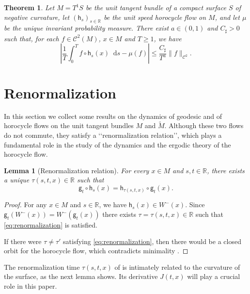 \documentclass[11pt,letterpaper]{amsart}
\newcommand \R {{ \mathbb R}}
\newcommand \tM {{\widetilde M}}
\newcommand \cC {{\mathscr{C}}}
\newcommand \sC {{C_\sharp}}
\newcommand{\horo}{\mathsf{h}}
\newcommand{\geo}{\mathsf{g}}
\newcommand*{\diff}{\mathop{}\!\mathrm{d}}
\newtheorem {lemma}[theorem]{Lemma}
\newtheorem{bigthm}{Theorem}
\theoremstyle{definition}
\begin{document}
\begin{bigthm}\label{thm:main_result_3}
Let $M = T^1S$ be the unit tangent bundle of a compact surface $S$ of negative curvature, let $(\horo_s)_{s \in \R}$ be the unit speed horocycle flow on $M$, and let $\mu$ be the unique invariant probability measure. There exist $a \in (0,1)$ and $\sC>0$ such that, for each $f\in \cC^2(M)$, $x\in M$ and $T \ge 1$, we have
\begin{equation}\label{eq:deviation}
\left\lvert \frac 1T \int_0^T f\circ \horo_s(x)\diff s - \mu(f) \right\rvert \leq \dfrac{\sC}{T^{a}} \|f\|_{\cC^2}.
\end{equation}
\end{bigthm}


\section{Renormalization}\label{sec:renorm}
In this section we collect some results on the dynamics of geodesic and of horocycle flows on the unit tangent bundles $M$ and $\tM$.
Although these two flows do not commute, they satisfy a \lq\lq renormalization relation\rq\rq, which plays a fundamental role in the study of the dynamics and the ergodic theory of the horocycle flow.

\begin{lemma}[Renormalization relation]\label{lem:renormalization}
For every $x\in M$ and $s,t \in \R$, there exists a unique $\tau(s,t,x) \in \R$ such that
\begin{equation}\label{eq:renormalization}
\geo_t \circ \horo_s(x) = \horo_{\tau(s,t,x)} \circ \geo_t(x).
\end{equation}
\end{lemma}
\begin{proof}
For any $x \in M$ and $s \in \R$, we have $\horo_s(x) \in W^{-}(x)$. Since $\geo_t(W^{-}(x)) = W^{-}(\geo_t(x))$ there exists $\tau = \tau(s,t,x) \in \R$ such that \eqref{eq:renormalization} is satisfied.

If there were $\tau \neq \tau'$ satisfying \eqref{eq:renormalization}, then there would be a closed orbit for the horocycle flow, which contradicts minimality \cite{Bow, Pla}.
\end{proof}

The renormalization time $\tau(s,t,x)$ of  is intimately related to the curvature of the surface, as the next lemma shows. Its derivative $J(t,x)$ will play a crucial role in this paper.
\end{document}
